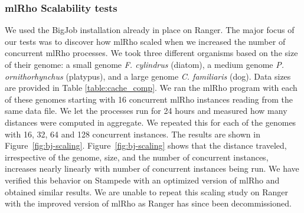 \documentclass{sig-alternate}
\begin{document}
\subsubsection{mlRho Scalability tests}
\label{sec:scalability}
We used the BigJob installation already in place on Ranger. The major focus of our tests was to discover how
mlRho scaled when we increased the number of concurrent mlRho processes. We took three different organisms
based on the size of their genome: a small genome {\it F. cylindrus} (diatom), a medium genome {\it
P. ornithorhynchus} (platypus), and a large genome {\it C. familiaris} (dog). Data sizes are provided in Table
\ref{table:cache_comp}. We ran the mlRho program with each of these genomes starting with 16 concurrent mlRho
instances reading from the same data file. We let the processes run for 24 hours and measured how many
distances were computed in aggregate. We repeated this for each of the genomes with 16, 32, 64 and 128
concurrent instances. The results are shown in Figure~\ref{fig:bj-scaling}. Figure~\ref{fig:bj-scaling} shows that the distance traveled, irrespective of the genome, size, and the number of concurrent instances, increases
nearly linearly with number of concurrent instances being run. We have verified this behavior on Stampede with
an optimized version of mlRho and obtained similar results. We are unable to repeat this scaling study on
Ranger with the improved version of mlRho as Ranger has since been decommissioned.


%
%
\end{document}
